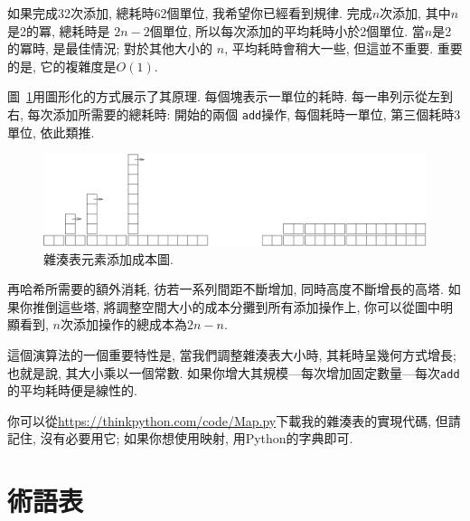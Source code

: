 \documentclass[10pt]{book}
\begin{document}
如果完成32次添加, 總耗時62個單位, 我希望你已經看到規律.
完成$n$次添加, 其中$n$是2的冪,
總耗時是 $2n-2$個單位, 所以每次添加的平均耗時小於2個單位.
當$n$是2的冪時, 是最佳情況;
對於其他大小的 $n$, 平均耗時會稍大一些, 但這並不重要.
重要的是, 它的複雜度是$O(1)$.

圖~\ref{fig.hash}用圖形化的方式展示了其原理. 
每個塊表示一單位的耗時. 
每一串列示從左到右, 每次添加所需要的總耗時: 開始的兩個
{\tt add}操作, 每個耗時一單位, 第三個耗時3單位, 依此類推. 

\begin{figure}
\centerline{\includegraphics[width=5.5in]{figs/towers.pdf}}
\caption{雜湊表元素添加成本圖.\label{fig.hash}}
\end{figure}

再哈希所需要的額外消耗, 彷若一系列間距不斷增加, 同時高度不斷增長的高塔.
如果你推倒這些塔, 將調整空間大小的成本分攤到所有添加操作上, 
你可以從圖中明顯看到, $n$次添加操作的總成本為$2n-n$.

這個演算法的一個重要特性是, 當我們調整雜湊表大小時, 其耗時呈幾何方式增長;
也就是說, 其大小乘以一個常數.
如果你增大其規模---每次增加固定數量---每次{\tt add}的平均耗時便是線性的.

你可以從\url{https://thinkpython.com/code/Map.py}下載我的雜湊表的實現代碼,
但請記住, 沒有必要用它; 如果你想使用映射, 用Python的字典即可.

\section{術語表}
\end{document}
